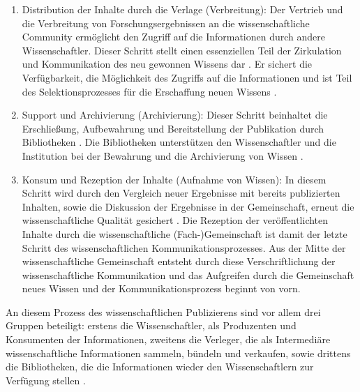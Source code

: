 \begin{enumerate}
\item Distribution der Inhalte durch die Verlage (Verbreitung):
Der Vertrieb und die Verbreitung von Forschungsergebnissen an die wissenschaftliche Community ermöglicht den Zugriff auf die Informationen durch andere Wissenschaftler. Dieser Schritt stellt einen essenziellen Teil der Zirkulation und Kommunikation des neu gewonnen Wissens dar \cite{cite:11i}. Er sichert die Verfügbarkeit, die Möglichkeit des Zugriffs auf die Informationen und ist Teil des Selektionsprozesses für die Erschaffung neuen Wissens \cite{cite:11l}.
\item Support und Archivierung (Archivierung): Dieser Schritt beinhaltet die Erschließung, Aufbewahrung und Bereitstellung der Publikation durch Bibliotheken \cite{schirmbacher_2009_wisspub}. Die Bibliotheken unterstützen den Wissenschaftler und die Institution bei der Bewahrung und die Archivierung von Wissen \cite{K_lbel_2002}.
\item Konsum und Rezeption der Inhalte (Aufnahme von Wissen): In diesem Schritt wird durch den Vergleich neuer Ergebnisse mit bereits publizierten Inhalten, sowie die Diskussion der Ergebnisse in der Gemeinschaft, erneut die wissenschaftliche Qualität gesichert \cite{umstatter_2007_qualitatssicherung}. Die Rezeption der veröffentlichten Inhalte durch die wissenschaftliche (Fach-)Gemeinschaft ist damit der letzte Schritt des wissenschaftlichen Kommunikationsprozesses. Aus der Mitte der wissenschaftliche Gemeinschaft entsteht durch diese Verschriftlichung der wissenschaftliche Kommunikation und das Aufgreifen durch die Gemeinschaft neues Wissen \cite{cite:11k} \cite{schirmbacher_2009_wisspub} und der Kommunikationsprozess beginnt von vorn.
\end{enumerate}

An diesem Prozess des wissenschaftlichen Publizierens sind vor allem drei Gruppen beteiligt: erstens die Wissenschaftler, als Produzenten und Konsumenten der Informationen, zweitens die Verleger, die als Intermediäre wissenschaftliche Informationen sammeln, bündeln und verkaufen, sowie drittens die Bibliotheken, die die Informationen wieder den Wissenschaftlern zur Verfügung stellen \cite{Odlyzko_1997}.

